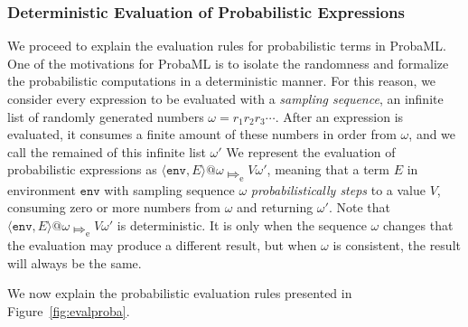 \documentclass[pageno]{jpaper}
\newcommand{\esteps}{\Mapsto_{\textrm{e}}}
\newcommand{\env}{\mathtt{env}}
\newcommand{\evalenv}[1]{\langle \env, #1 \rangle}
\begin{document}
\subsubsection{Deterministic Evaluation of Probabilistic Expressions}
We proceed to explain the evaluation rules for probabilistic terms in ProbaML. One of the motivations for ProbaML is to isolate the randomness and formalize the probabilistic computations in a deterministic manner. For this reason, we consider every expression to be evaluated with a \emph{sampling sequence}, an infinite list of randomly generated numbers $\omega=r_1 r_2 r_3 \cdots$. After an expression is evaluated, it consumes a finite amount of these numbers in order from $\omega$, and we call the remained of this infinite list $\omega'$
We represent the evaluation of probabilistic expressions as $\evalenv{E} @ \omega \esteps V \omega'$, meaning that a term $E$ in environment $\env$ with sampling sequence $\omega$ \emph{probabilistically steps} to a value $V$, consuming zero or more numbers from $\omega$ and returning $\omega'$. Note that $\evalenv{E} @ \omega \esteps V \omega'$ is deterministic. It is only when the sequence $\omega$ changes that the evaluation may produce a different result, but when $\omega$ is consistent, the result will always be the same.

We now explain the probabilistic evaluation rules presented in Figure~\ref{fig:evalproba}.
\end{document}
